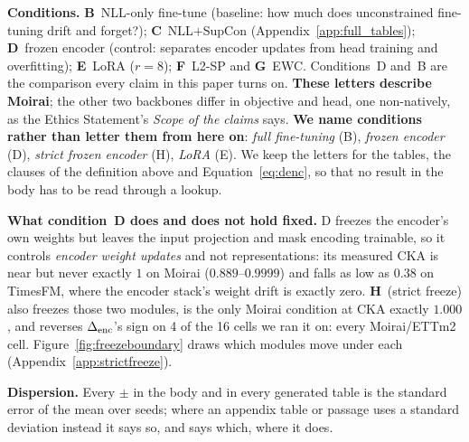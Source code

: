 \textbf{Conditions.} \textbf{B}~NLL-only fine-tune (baseline: how much does
unconstrained fine-tuning drift and forget?); \textbf{C}~NLL$+$SupCon
(Appendix~\ref{app:full_tables});
\textbf{D}~frozen encoder (control: separates encoder updates from head
training and overfitting); \textbf{E}~LoRA ($r{=}8$); \textbf{F}~L2-SP and
\textbf{G}~EWC. Conditions~D and~B are the comparison every claim in this
paper turns on.  \textbf{These letters describe Moirai}; the other two backbones
differ in objective and head, one non-natively, as the Ethics Statement's
\emph{Scope of the claims} says.  \textbf{We name conditions rather than letter them from here on}:
\emph{full fine-tuning} (B), \emph{frozen encoder} (D), \emph{strict frozen
encoder} (H), \emph{LoRA} (E).  We keep the letters for the tables, the clauses
of the definition above and Equation~\ref{eq:denc}, so that no result in the body
has to be read through a lookup.

\textbf{What condition~D does and does not hold fixed.} D freezes the encoder's
own weights but leaves the input projection and mask encoding trainable, so it
controls \emph{encoder weight updates} and not representations: its measured CKA
is near but never exactly $1$ on Moirai ($0.889$--$0.9999$) and falls as low as
$0.38$ on TimesFM, where the encoder stack's weight drift is exactly zero.
\textbf{H}~(strict freeze) also freezes those two modules, is the only Moirai
condition at CKA exactly $1.000$, and reverses $\Delta_\text{enc}$'s sign on 4 of the 16 cells we ran
it on: every Moirai/ETTm2 cell.  Figure~\ref{fig:freezeboundary} draws which
modules move under each (Appendix~\ref{app:strictfreeze}).

\textbf{Dispersion.} Every ${\pm}$ in the body and in every generated table is
the standard error of the mean over seeds; where an appendix table or passage
uses a standard deviation instead it says so, and says which, where it does.

\begin{center}
\end{center}
